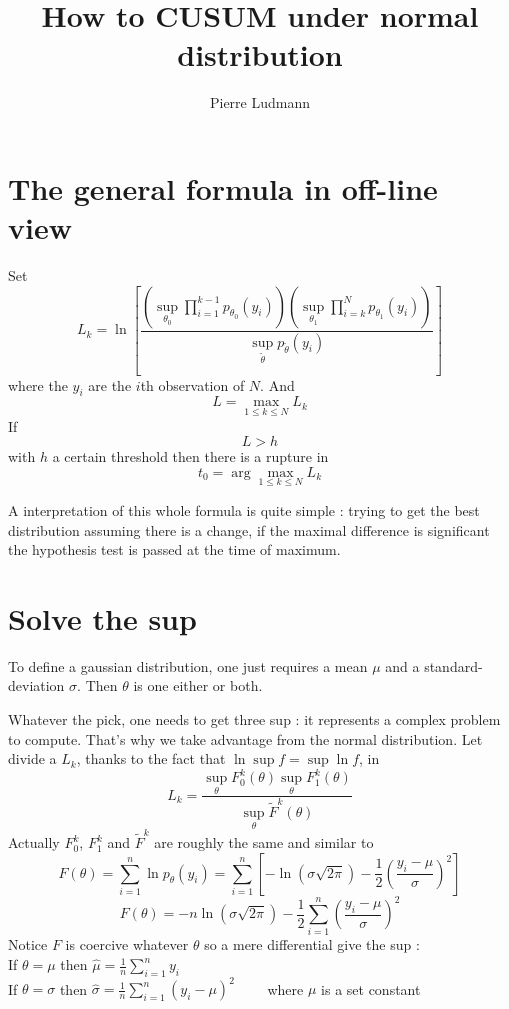 \documentclass[11pt]{article}
\title{\textbf{How to CUSUM under normal distribution}}
\author{Pierre Ludmann}
\begin{document}
\maketitle

\section{The general formula in off-line view}

Set
\[L_k=\ln\left[\frac{\left(\sup_{\theta_0}\prod_{i=1}^{k-1}p_{\theta_0}(y_i)\right)\left(\sup_{\theta_1}\prod_{i=k}^Np_{\theta_1}(y_i)\right)}{\sup_{\tilde\theta}p_{\tilde\theta}(y_i)}\right]\]
where the $y_i$ are the $i$th observation of $N$.
And
\[L=\max_{1\le k\le N}L_k\]
If \[L>h\] with $h$ a certain threshold then there is a rupture in \[t_0=\arg\max_{1\le k\le N}L_k\]

A interpretation of this whole formula is quite simple : trying to get the best distribution assuming there is a change, if the maximal difference is significant the hypothesis test is passed at the time of maximum.

\section{Solve the sup}

To define a gaussian distribution, one just requires a mean $\mu$ and a standard-deviation $\sigma$. Then $\theta$ is one either or both.

Whatever the pick, one needs to get three sup : it represents a complex problem to compute. That's why we take advantage from the normal distribution.
Let divide a $L_k$, thanks to the fact that $\ln\sup f=\sup\ln f$, in
\[L_k=\frac{\sup_\theta F^k_0(\theta)\sup_\theta F^k_1(\theta)}{\sup_\theta\tilde F^k(\theta)}\]
Actually $F^k_0$, $F^k_1$ and $\tilde F^k$ are roughly the same and similar to
\[F(\theta)=\sum_{i=1}^n\ln p_\theta(y_i)=\sum_{i=1}^n\left[-\ln(\sigma\sqrt{2\pi})-\frac 12\left(\frac{y_i-\mu}\sigma\right)^2\right]\]
\[F(\theta)=-n\ln(\sigma\sqrt{2\pi})-\frac 12\sum_{i=1}^n\left(\frac{y_i-\mu}\sigma\right)^2\]
Notice $F$ is coercive whatever $\theta$ so a mere differential give the sup :
\\

If $\theta=\mu$ then $\hat\mu=\frac 1n\sum_{i=1}^ny_i$\\

If $\theta=\sigma$ then $\hat\sigma=\frac 1n\sum_{i=1}^n(y_i-\mu)^2$ ~~~~where $\mu$ is a set constant\\
\end{document}
